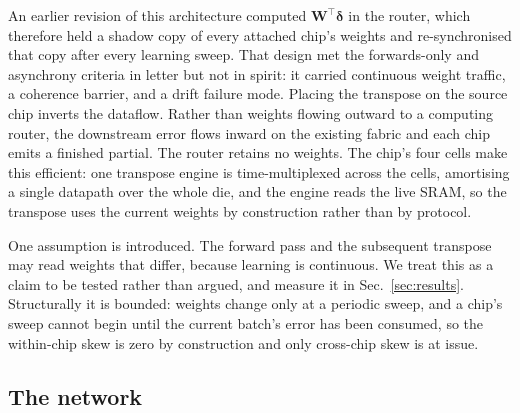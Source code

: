 \documentclass[11pt]{article}
\newcommand{\W}{\bm W}
\newcommand{\bdelta}{\bm\delta}
\begin{document}
An earlier revision of this architecture computed $\W^{\!\top}\bdelta$ in the router, which therefore
held a shadow copy of every attached chip's weights and re-synchronised that copy after every learning
sweep. That design met the forwards-only and asynchrony criteria in letter but not in spirit: it
carried continuous weight traffic, a coherence barrier, and a drift failure mode. Placing the
transpose on the source chip inverts the dataflow. Rather than weights flowing outward to a computing
router, the downstream error flows inward on the existing fabric and each chip emits a finished
partial. The router retains no weights. The chip's four cells make this efficient: one transpose
engine is time-multiplexed across the cells, amortising a single datapath over the whole die, and the
engine reads the live SRAM, so the transpose uses the current weights by construction rather than by
protocol.

One assumption is introduced. The forward pass and the subsequent transpose may read weights that
differ, because learning is continuous. We treat this as a claim to be tested rather than argued, and
measure it in Sec.~\ref{sec:results}. Structurally it is bounded: weights change only at a periodic
sweep, and a chip's sweep cannot begin until the current batch's error has been consumed, so the
within-chip skew is zero by construction and only cross-chip skew is at issue.

\subsection{The network}\label{sec:network}
\end{document}

